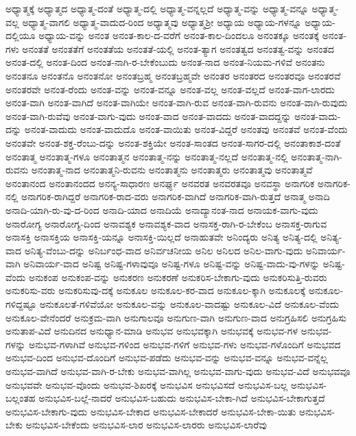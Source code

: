 {ಅಧ್ಯಾತ್ಮಕ್ಕೆ
ಅಧ್ಯಾತ್ಮದ
ಅಧ್ಯಾತ್ಮ-ದಂತೆ
ಅಧ್ಯಾತ್ಮ-ದಲ್ಲಿ
ಅಧ್ಯಾತ್ಮ-ವನ್ನಲ್ಲದೆ
ಅಧ್ಯಾತ್ಮ-ವನ್ನು
ಅಧ್ಯಾತ್ಮ-ವನ್ನೂ
ಅಧ್ಯಾತ್ಮ-ವಲ್ಲ
ಅಧ್ಯಾತ್ಮ-ವಾಗಲಿ
ಅಧ್ಯಾತ್ಮ-ವಾದುದ-ರಿಂದ
ಅಧ್ಯಾತ್ಮವು
ಅಧ್ಯಾತ್ಮಶ್ರೀ
ಅಧ್ಯಾಯ
ಅಧ್ಯಾಯ-ಗಳನ್ನೂ
ಅಧ್ಯಾಯ-ದಲ್ಲಿಯೂ
ಅಧ್ಯಾಯ-ವನ್ನು
ಅನಂತ
ಅನಂತ-ಕಾಲ-ದ-ವರೆಗೆ
ಅನಂತ-ಕಾಲ-ದಿಂದಲೂ
ಅನಂತಕ್ಕೂ
ಅನಂತಕ್ಕೆ
ಅನಂತ-ಗಳು
ಅನಂತತೆ
ಅನಂತತೆಗೆ
ಅನಂತತೆಯ
ಅನಂತತೆ-ಯಲ್ಲಿ
ಅನಂತ-ತ್ಯಾಗ
ಅನಂತತ್ವದ
ಅನಂತತ್ವ-ವನ್ನು
ಅನಂತದ
ಅನಂತ-ದಲ್ಲಿ
ಅನಂತ-ದಿಂದ
ಅನಂತ-ನಾಗಿ-ರ-ಬೇಕೆಂಬುದು
ಅನಂತ-ನಾದ
ಅನಂತ-ನಿಯಮ-ಗಳಿವೆ
ಅನಂತನು
ಅನಂತನೂ
ಅನಂತನೊ
ಅನಂತನೋ
ಅನಂತಬ್ರಹ್ಮ
ಅನಂತಬ್ರಹ್ಮವೇ
ಅನಂತರ
ಅನಂತರದ
ಅನಂತರವೂ
ಅನಂತರವೆ
ಅನಂತರವೇ
ಅನಂತ-ರೆಂದು
ಅನಂತ-ವನ್ನು
ಅನಂತ-ವನ್ನೂ
ಅನಂತ-ವಲ್ಲ
ಅನಂತ-ವಲ್ಲದೆ
ಅನಂತ-ವಾಗ-ಲಾರದು
ಅನಂತ-ವಾಗಿ
ಅನಂತ-ವಾಗಿದೆ
ಅನಂತ-ವಾಗಿಯೇ
ಅನಂತ-ವಾಗಿ-ರುವ
ಅನಂತ-ವಾಗಿ-ರುವನು
ಅನಂತ-ವಾಗಿ-ರುವುದು
ಅನಂತ-ವಾಗಿ-ರುವೆವು
ಅನಂತ-ವಾಗು-ವುದು
ಅನಂತ-ವಾದ
ಅನಂತ-ವಾದದು
ಅನಂತ-ವಾದದ್ದನ್ನು
ಅನಂತ-ವಾದು-ದನ್ನು
ಅನಂತ-ವಾದುದು
ಅನಂತ-ವಾದುದೊ
ಅನಂತ-ವಾಯಿತು
ಅನಂತ-ವಿದ್ದರೆ
ಅನಂತವು
ಅನಂತವೆ
ಅನಂತ-ವೆಂದು
ಅನಂತವೇ
ಅನಂತ-ಶಕ್ತ-ರೆಂಬು-ದನ್ನು
ಅನಂತ-ಶಕ್ತಿಯೇ
ಅನಂತ-ಸಾಂತದ
ಅನಂತ-ಸಾಗರ-ದಲ್ಲಿ
ಅನಂತಾಕಾಶ-ದಂತೆ
ಅನಂತಾತ್ಮ
ಅನಂತಾತ್ಮ-ಗಳೂ
ಅನಂತಾತ್ಮನ
ಅನಂತಾತ್ಮ-ನನ್ನು
ಅನಂತಾತ್ಮ-ನಲ್ಲದೆ
ಅನಂತಾತ್ಮ-ನಲ್ಲಿ
ಅನಂತಾತ್ಮ-ನಾಗಿ-ರುವನು
ಅನಂತಾತ್ಮ-ನಾದ
ಅನಂತಾತ್ಮನಿ-ರುವನು
ಅನಂತಾತ್ಮನು
ಅನಂತಾತ್ಮರು
ಅನಂತಾತ್ಮವು
ಅನಂತಾತ್ಮವೆ
ಅನಂತಾನಂದ
ಅನಂತಾನಂದದ
ಅನನ್ಯ-ಸಾಧಾರಣ
ಅನರ್ಘ್ಯ
ಅನವರತ
ಅನವರತವೂ
ಅನವಸ್ಥಾ
ಅನಾಗರಿಕ
ಅನಾಗರಿಕ-ನಲ್ಲಿ
ಅನಾಗರಿಕ-ರಾಗಿದ್ದರೆ
ಅನಾಗರಿಕ-ರಾದ-ವರು
ಅನಾಗರಿಕ-ವಾಗಿದೆ
ಅನಾಗರಿಕ-ವಾಗಿ-ರುತ್ತದೆ
ಅನಾತ್ಮ
ಅನಾದಿ
ಅನಾದಿ-ಯಾಗಿ-ರು-ವು-ದ-ರಿಂದ
ಅನಾದಿ-ಯಾದ
ಅನಾದಿಯೆ
ಅನಾದ್ಯಾನಂತ-ನಾದ
ಅನಾಯಕ-ವಾಗು-ವುದು
ಅನಾರೋಗ್ಯ
ಅನಾರೋಗ್ಯ-ದಿಂದ
ಅನಾವಶ್ಯಕ
ಅನಾವಶ್ಯಕ-ವಾದ
ಅನಾಸಕ್ತ-ರಾಗಿ-ರ-ಬೇಕೆಂಬ
ಅನಾಸಕ್ತ-ರಾಗುವ
ಅನಾಸಕ್ತಿ
ಅನಾಸಕ್ತಿಯ
ಅನಾಸಕ್ತಿ-ಯನ್ನೂ
ಅನಾಸಕ್ತಿ-ಯಿಲ್ಲದೆ
ಅನಾಹುತವೇ
ಅನಿಂದ್ಯರು
ಅನಿತ್ಯ
ಅನಿತ್ಯ-ದಲ್ಲಿ
ಅನಿತ್ಯ-ವಾದ
ಅನಿತ್ಯ-ವೆಂಬು-ದನ್ನು
ಅನಿರ್ಬಂಧ-ವಾದ
ಅನಿರ್ವಚನೀಯ
ಅನಿಲ
ಅನಿಲದ
ಅನಿಲ-ವಾಗು-ವುದು
ಅನಿವಾರ್ಯ-ವಾಗಿ
ಅನಿವಾರ್ಯ-ವಾದ
ಅನಿಷ್ಟ
ಅನಿಷ್ಟ-ಗಳಾವುವೂ
ಅನಿಷ್ಟ-ಗಳೂ
ಅನಿಷ್ಟ-ವನ್ನು
ಅನಿಷ್ಟ-ವಾದು-ವು-ಗಳನ್ನು
ಅನಿಷ್ಟ-ವೆಂದು
ಅನುಕಂಪ
ಅನುಕಂಪ-ವನ್ನು
ಅನುಕರಣ
ಅನುಕರಣೆ
ಅನುಕರಿಸ-ಬೇಕಾಗು-ವುದು
ಅನುಕರಿಸುತ್ತಿ-ರುವರು
ಅನುಕರಿಸು-ವರು
ಅನುಕರಿಸುವು-ದಕ್ಕೆ
ಅನುಕೂಲ
ಅನುಕೂಲ-ಕರ-ವಾದ
ಅನುಕೂಲ-ಕ್ಕಾಗಿ
ಅನುಕೂಲಕ್ಕೆ
ಅನುಕೂಲ-ಗಳಿದ್ದಷ್ಟೂ
ಅನುಕೂಲತೆ-ಗಳಿವೆಯೋ
ಅನುಕೂಲ-ವನ್ನು
ಅನುಕೂಲ-ವಾದಷ್ಟು
ಅನುಕೂಲ-ವಿದೆ
ಅನುಕೂಲ-ವೆಂದು
ಅನುಕೂಲ-ವೇನೆಂದರೆ
ಅನುಕ್ರಮ-ವಾಗಿ
ಅನುಗಾಲವೂ
ಅನುಗುಣ-ವಾಗಿ
ಅನುಗುಣ-ವಾದ
ಅನುಗ್ರಹಿಸಲಿ
ಅನುಗ್ರಹಿಸು
ಅನುತಾಪ-ವಿದೆ
ಅನುದಿನದ
ಅನುಧ್ಯಾನ-ಮಾಡಿ
ಅನುಭವ
ಅನುಭವಕ್ಕಾಗಿ
ಅನುಭವಕ್ಕೆ
ಅನುಭವ-ಗಳ
ಅನುಭವ-ಗಳನ್ನು
ಅನುಭವ-ಗಳಾಗಿವೆ
ಅನುಭವ-ಗಳಿಂದ
ಅನುಭವ-ಗಳಿಗೆ
ಅನುಭವ-ಗಳು
ಅನುಭವ-ಗಳೊಂದಿಗೆ
ಅನುಭವದ
ಅನುಭವ-ದಿಂದ
ಅನುಭವ-ದೊಂದಿಗೆ
ಅನುಭವ-ಪಡೆದು
ಅನುಭವ-ವನ್ನು
ಅನುಭವ-ವನ್ನೂ
ಅನುಭವ-ವನ್ನೆಲ್ಲ
ಅನುಭವ-ವಾಗಿದೆ
ಅನುಭವ-ವಾಗಿ-ರ-ಬೇಕು
ಅನುಭವ-ವಾಗಿಲ್ಲ
ಅನುಭವ-ವಾಗು-ವುದು
ಅನುಭವ-ವಿದೆ
ಅನುಭವವೂ
ಅನುಭವವೇ
ಅನುಭವ-ವೊಂದು
ಅನುಭವ-ಶಿಖರಕ್ಕೆ
ಅನುಭವಿಸ
ಅನುಭವಿಸದೆ
ಅನುಭವಿಸ-ಬಲ್ಲ
ಅನುಭವಿಸ-ಬಲ್ಲಂತಹ
ಅನುಭವಿಸ-ಬಲ್ಲೆ-ನಾದರೆ
ಅನುಭವಿಸ-ಬಹುದು
ಅನುಭವಿಸ-ಬೇಕಾ-ಗಿದೆ
ಅನುಭವಿಸ-ಬೇಕಾಗುತ್ತದೆ
ಅನುಭವಿಸ-ಬೇಕಾಗು-ವುದು
ಅನುಭವಿಸ-ಬೇಕಾದ
ಅನುಭವಿಸ-ಬೇಕಾದರೆ
ಅನುಭವಿಸ-ಬೇಕಾ-ಯಿತು
ಅನುಭವಿಸ-ಬೇಕು
ಅನುಭವಿಸ-ಬೇಕೆಂದು
ಅನುಭವಿಸ-ಲಾರ
ಅನುಭವಿಸ-ಲಾರರು
ಅನುಭವಿಸ-ಲಾರೆವು
}
